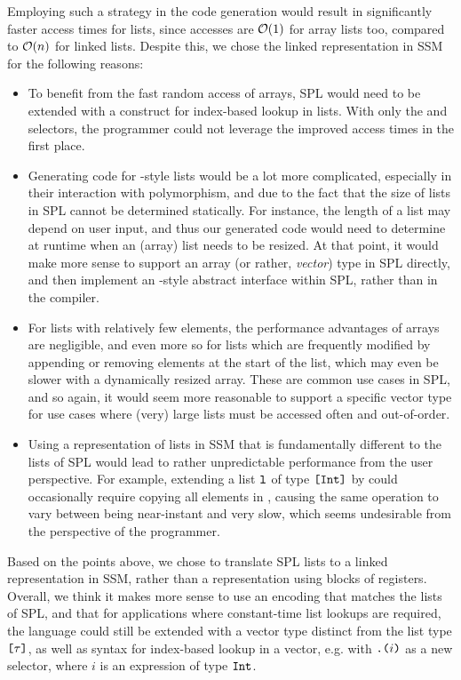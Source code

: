 Employing such a strategy in the code generation would result in significantly
faster access times for lists, since accesses are $\mathcal{O}(1)$ for array lists
too, compared to $\mathcal{O}(n)$ for linked lists.
Despite this, we chose the linked representation in SSM for the following reasons:
%
\begin{itemize}
  \item To benefit from the fast random access of arrays, SPL would need to be
        extended with a construct for index-based lookup in lists. With only the
         and  selectors, the programmer could not leverage the
        improved access times in the first place.
  \item Generating code for -style lists would be a lot more
        complicated, especially in their interaction with polymorphism, and due
        to the fact that the size of lists in SPL cannot be determined
        statically. For instance, the length of a list may depend on user input,
        and thus our generated code would need to determine at runtime when an
        (array) list needs to be resized. At that point, it would make more
        sense to support an array (or rather, \emph{vector}) type in SPL
        directly, and then implement an -style abstract
        interface within SPL, rather than in the compiler.
  \item For lists with relatively few elements, the performance advantages of
        arrays are negligible, and even more so for lists which are frequently
        modified by appending or removing elements at the start of the list,
        which may even be slower with a dynamically resized array.
        These are common use cases in SPL, and so again, it would seem more
        reasonable to support a specific vector type for use cases where (very)
        large lists must be accessed often and out-of-order.
  \item Using a representation of lists in SSM that is fundamentally different
        to the lists of SPL would lead to rather unpredictable performance from
        the user perspective. For example, extending a list
        $\texttt{l}$ of type $\texttt{[}\texttt{Int}\texttt{]}$ by  could occasionally
        require copying all elements in , causing the same operation to
        vary between being near-instant and very slow, which seems undesirable
        from the perspective of the programmer.
\end{itemize}

Based on the points above, we chose to translate SPL lists to a linked
representation in SSM, rather than a representation using blocks of registers.
Overall, we think it makes more sense to use an encoding that matches the lists
of SPL, and that for applications where constant-time list lookups are required,
the language could still be extended with a vector type distinct from the list
type $\texttt{[}\tau\texttt{]}$, as well as syntax for index-based lookup in a vector, e.g.
with $\texttt{.(}i\texttt{)}$ as a new selector, where $i$ is an expression of type
$\texttt{Int}$.


